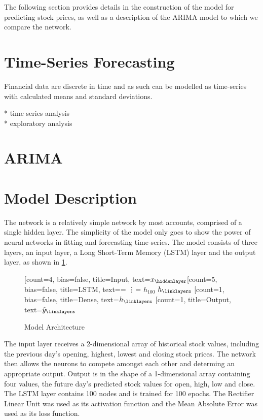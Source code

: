 \graphicspath{{./figures/}}

The following section provides details in the construction of the model for predicting stock prices, as well as a description of the ARIMA model to which we compare the network.

\section{Time-Series Forecasting}
Financial data are discrete in time and as such can be modelled as time-series with calculated means and standard deviations.

* time series analysis\\
* exploratory analysis
\section{ARIMA}


\section{Model Description}
The network is a relatively simple network by most accounts, comprised of a single hidden layer. The simplicity of the model only goes to show the power of neural networks in fitting and forecasting time-series. The model consists of three layers, an input layer, a Long Short-Term Memory (LSTM) layer and the output layer, as shown in \ref{tab:model_arch}.

\begin{figure}[h]
    \centering
    \begin{neuralnetwork}[height=4]
        \newcommand{\x}[2]{$x_#2$}
        \newcommand{\y}[2]{$\hat{y}_#2$}
        \newcommand{\h}[2]{$h_#2$}
        \newcommand{\hlast}[2]{\ifnum4=#2 \vdots \else \ifnum5=#2 $h_{100}$ \else $h_#2$ \fi \fi}
        [count=4, bias=false, title=Input, text=\x]
        \hiddenlayer[count=5, bias=false, title=LSTM, text=\hlast] 
        \linklayers
        \hiddenlayer[count=1, bias=false, title=Dense, text=\h]
        \linklayers
        \outputlayer[count=1, title=Output, text=\y] 
        \linklayers
    \end{neuralnetwork}
    \caption{Model Architecture}
    \label{tab:model_arch}
\end{figure}

The input layer receives a 2-dimensional array of historical stock values, including the previous day's opening, highest, lowest and closing stock prices. The network then allows the neurons to compete amongst each other and determing an appropriate output. Output is in the shape of a 1-dimensional array containing four values, the future day's predicted stock values for open, high, low and close. The LSTM layer contains 100 nodes and is trained for 100 epochs. The Rectifier Linear Unit was used as its activation function and the Mean Absolute Error was used as its loss function.

